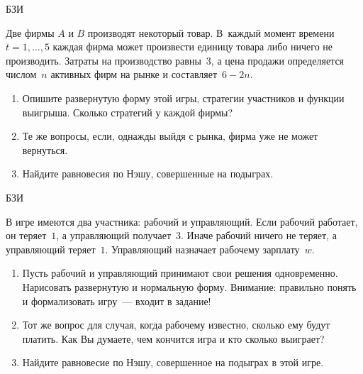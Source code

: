 \begin{problem}
\begin{source}
БЗИ
\end{source}
 Две фирмы $A$ и $B$ производят
некоторый товар. В~каждый момент времени $t=1,\ldots,5$
каждая фирма может произвести единицу товара либо ничего не
производить. Затраты на производство равны~$3$, а цена
продажи определяется числом~$n$ активных фирм на рынке и
составляет~$6-2n$.

\begin{enumerate}

\item Опишите развернутую форму этой игры, стратегии
участников и функции выигрыша. Сколько стратегий у каждой
фирмы?

\item Те же вопросы, если, однажды выйдя с рынка, фирма уже
не может вернуться.

\item Найдите равновесия по Нэшу, совершенные на подыграх.

\end{enumerate}






\begin{sol}

\end{sol}
\end{problem}



\begin{problem}
\begin{source}
БЗИ
\end{source}
 В игре имеются два
участника: рабочий и управляющий. Если рабочий работает, он
теряет~$1$, а управляющий получает~$3$. Иначе рабочий
ничего не теряет,  а управляющий теряет~$1$. Управляющий
назначает рабочему зарплату~$w$.

\begin{enumerate}

\item Пусть рабочий и управляющий принимают свои решения
одновременно. Нарисовать развернутую и нормальную форму.
Внимание: правильно понять и формализовать игру~— входит
в задание!


\item Тот же вопрос для случая, когда рабочему известно,
сколько ему будут платить. Как Вы думаете, чем кончится
игра и кто сколько выиграет?

\item Найдите равновесие по Нэшу, совершенное на подыграх в этой игре.

\end{enumerate}






\begin{sol}

\end{sol}
\end{problem}






